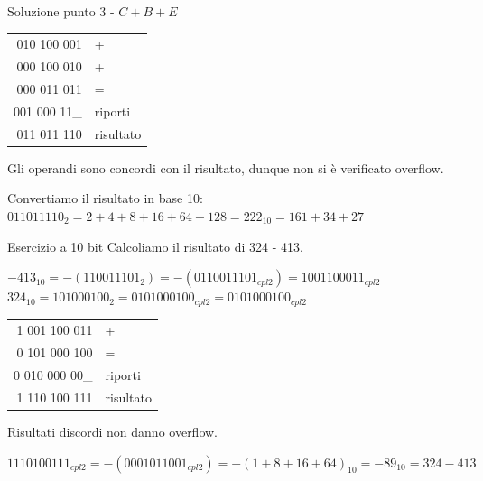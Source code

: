 \documentclass[9pt, format=169]{beamer}
\begin{document}
\begin{frame}{Soluzione punto 3 - $C+B+E$}
\begin{tabular}{r|l}
	010 100 001 & + \\
	000 100 010 & + \\
	000 011 011 &	=	\\
	\hline
	001 000 11\_&	riporti\\
	011 011 110	& risultato
\end{tabular}

\pause
Gli operandi sono concordi con il risultato, dunque non si è verificato overflow.

\pause
Convertiamo il risultato in base 10: $011011110_2 = 2+4+8+16+64+128 = 222_{10} = 161+34+27$
\end{frame}

\begin{frame}{Esercizio a 10 bit}
Calcoliamo il risultato di 324 - 413.

\pause
$-413_{10} = -(110011101_2) = -(0110011101_{cpl2}) = 1001100011_{cpl2}$\\
$324_{10} = 101000100_2 = 0101000100_{cpl2}        = 0101000100_{cpl2}$

\pause
\begin{tabular}{r|l}
	1 001 100 011 & + \\
	0 101 000 100 & = \\
	\hline
	0 010 000 00\_&	riporti\\
    1 110 100 111 & risultato
\end{tabular}

\pause
Risultati discordi non danno overflow.

\pause
$1110100111_{cpl2} = -(0001011001_{cpl2}) = -(1+8+16+64)_{10} = -89_{10} = 324-413$
\end{frame}
\end{document}

